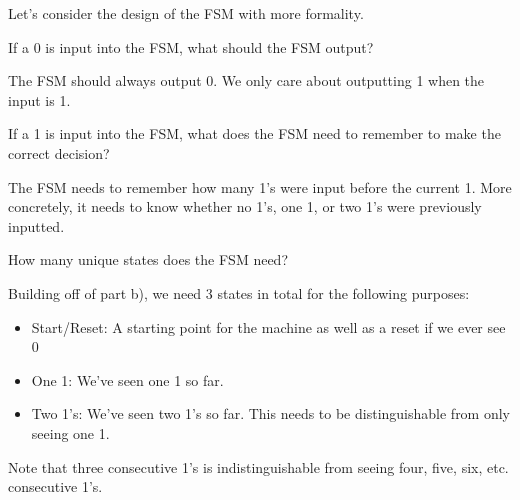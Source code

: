 \begin{blocksection}
\question
Let’s consider the design of the FSM with more formality.

\begin{parts}
\item
If a 0 is input into the FSM, what should the FSM output?
\begin{solution}[0.3in]
The FSM should always output 0. We only care about outputting 1 when the input is 1.
\end{solution}

\item
If a 1 is input into the FSM, what does the FSM need to remember to make the correct decision?
\begin{solution}[0.3in]
The FSM needs to remember how many 1’s were input before the current 1. More concretely, it needs to know whether no 1’s, one 1, or two 1’s were previously inputted.
\end{solution}

\item
How many unique states does the FSM need?
\begin{solution}
Building off of part b), we need 3 states in total for the following purposes:
\begin{itemize}
\item Start/Reset: A starting point for the machine as well as a reset if we ever see 0
\item One 1: We’ve seen one 1 so far.
\item Two 1’s: We’ve seen two 1’s so far. This needs to be distinguishable from only seeing one 1.
\end{itemize}
Note that three consecutive 1’s is indistinguishable from seeing four, five, six, etc. consecutive 1’s.
\end{solution}
\end{parts}
\end{blocksection}